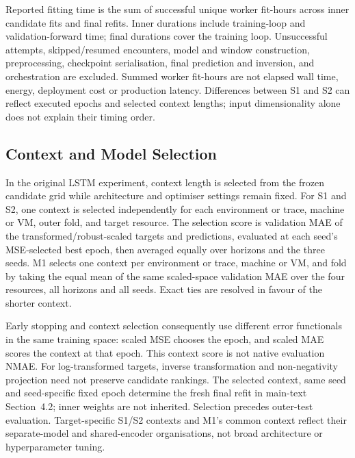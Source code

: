 \documentclass[a4paper,11pt]{article}
\begin{document}
Reported fitting time is the sum of successful unique worker fit-hours across
inner candidate fits and final refits. Inner durations include training-loop
and validation-forward time; final durations cover the training loop.
Unsuccessful attempts, skipped/resumed encounters, model and window
construction, preprocessing, checkpoint serialisation, final prediction and
inversion, and orchestration are excluded. Summed worker fit-hours are not
elapsed wall time, energy, deployment cost or production latency. Differences
between S1 and S2 can reflect executed epochs and selected context lengths;
input dimensionality alone does not explain their timing order.

\subsection*{Context and Model Selection}


In the original LSTM experiment, context length is selected from the frozen
candidate grid while architecture and optimiser settings remain fixed.
For S1 and S2, one context
is selected independently for each environment or trace, machine or VM, outer
fold, and target resource. The selection score is validation MAE of the
transformed/robust-scaled targets and predictions, evaluated at each seed's
MSE-selected best epoch, then averaged equally over horizons and the three
seeds. M1 selects one context per environment or trace, machine or VM, and
fold by taking the equal mean of the same scaled-space validation MAE over
the four resources, all horizons and all seeds. Exact ties are resolved
in favour of the shorter context.

Early stopping and context selection consequently use different error
functionals in the same training space: scaled MSE chooses the epoch, and
scaled MAE scores the context at that epoch. This context score is not native
evaluation NMAE. For log-transformed targets, inverse transformation and
non-negativity projection need not preserve candidate rankings.
The selected context, same seed and seed-specific fixed epoch determine the
fresh final refit in main-text Section~4.2; inner weights are not
inherited. Selection precedes outer-test evaluation. Target-specific S1/S2
contexts and M1's common context reflect their separate-model and shared-encoder
organisations, not broad architecture or hyperparameter tuning.

\clearpage
\end{document}
